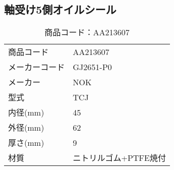 \subsection{軸受け5側オイルシール}
\begin{table}[htb]
\begin{center}
  \caption{商品コード：AA213607}
  \begin{tabular}{ll}
    \hline
    商品コード&AA213607\\
    メーカーコード&GJ2651-P0\\
    メーカー&NOK\\
    型式&TCJ\\
    内径(mm)&45
    \\外径(mm)&62
    \\厚さ(mm)&9\\
    材質&ニトリルゴム+PTFE焼付\\
    \hline
  \end{tabular}
\end{center}
\end{table}


